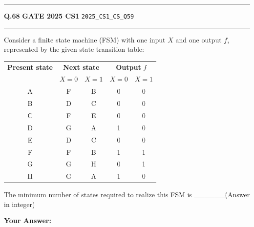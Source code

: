 \documentclass[a4paper,10pt]{article}
\begin{document}
\vspace{6pt}\hrule height 0.35pt\vspace{6pt}
\noindent
\begin{tcolorbox}[
    blanker,
    sidebyside,
    sidebyside align=top,
    lefthand width=0.55\textwidth,
    top=4pt, bottom=4pt, left=0pt, right=0pt,
    middle=16pt,
    underlay={
        \draw[dashed, black!80, line width=0.8pt, dash pattern=on 4pt off 3pt]
            ([xshift=0.55\textwidth+8pt]frame.north west) --
            ([xshift=0.55\textwidth+8pt]frame.south west);
    }
]
\textbf{Q.68}  \hfill {\footnotesize\textbf{GATE 2025 CS1} \quad \tiny\texttt{2025\_CS1\_CS\_Q59}}
\vspace{2pt}\hrule height 0.3pt\vspace{4pt}

Consider a finite state machine (FSM) with one input $X$ and one output $f$, represented by the given state transition table:
\par\medskip
\begin{tabular}{|c|cc|cc|}
\hline
\textbf{Present state} & \multicolumn{2}{c|}{\textbf{Next state}} & \multicolumn{2}{c|}{\textbf{Output } $f$} \\
& $X=0$ & $X=1$ & $X=0$ & $X=1$ \\
\hline
A & F & B & 0 & 0 \\
B & D & C & 0 & 0 \\
C & F & E & 0 & 0 \\
D & G & A & 1 & 0 \\
E & D & C & 0 & 0 \\
F & F & B & 1 & 1 \\
G & G & H & 0 & 1 \\
H & G & A & 1 & 0 \\
\hline
\end{tabular}
\par\medskip
The minimum number of states required to realize this FSM is \_\_\_\_\_\_\. (Answer in integer)

\par\vspace{6pt}\noindent\textbf{Your Answer:} \fbox{\rule{0pt}{1.3ex}\hspace{3cm}}

\tcblower


\end{tcolorbox}
\end{document}
